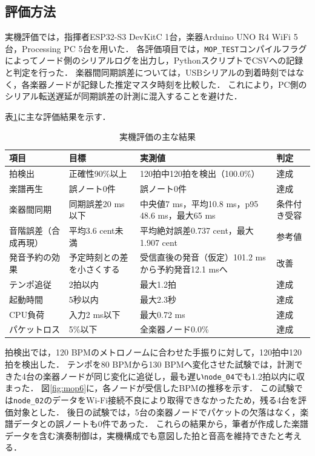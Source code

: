 \documentclass[uplatex,dvipdfmx]{jlreq}
\begin{document}
\subsection{評価方法}
実機評価では，指揮者ESP32-S3 DevKitC 1台，楽器Arduino UNO R4 WiFi 5台，Processing PC 5台を用いた．
各評価項目では，\texttt{MOP\_TEST}コンパイルフラグによってノード側のシリアルログを出力し，PythonスクリプトでCSVへの記録と判定を行った．
楽器間同期誤差については，USBシリアルの到着時刻ではなく，各楽器ノードが記録した推定マスタ時刻を比較した．
これにより，PC側のシリアル転送遅延が同期誤差の計測に混入することを避けた\cite{mop-report}．

表\ref{tab:evaluation}に主な評価結果を示す．

\begin{table}[H]
\centering
\caption{実機評価の主な結果}
\label{tab:evaluation}
\small
\begin{tabular}{p{23mm}p{35mm}p{43mm}p{25mm}}
\hline
項目 & 目標 & 実測値 & 判定 \\
\hline
拍検出 & 正確性90\%以上 & 120拍中120拍を検出（100.0\%） & 達成 \\
楽譜再生 & 誤ノート0件 & 誤ノート0件 & 達成 \\
楽器間同期 & 同期誤差20 ms以下 & 中央値7 ms，平均10.8 ms，p95 48.6 ms，最大65 ms & 条件付き受容 \\
音階誤差（合成再現） & 平均3.6 cent未満 & 平均絶対誤差0.737 cent，最大1.907 cent & 参考値 \\
発音予約の効果 & 予定時刻との差を小さくする & 受信直後の発音（仮定）101.2 msから予約発音12.1 msへ & 改善 \\
テンポ追従 & 2拍以内 & 最大1.2拍 & 達成 \\
起動時間 & 5秒以内 & 最大2.3秒 & 達成 \\
CPU負荷 & 入力2 ms以下 & 最大0.72 ms & 達成 \\
パケットロス & 5\%以下 & 全楽器ノード0.0\% & 達成 \\
\hline
\end{tabular}
\end{table}

拍検出では，120 BPMのメトロノームに合わせた手振りに対して，120拍中120拍を検出した．
テンポを80 BPMから130 BPMへ変化させた試験では，計測できた4台の楽器ノードが同じ変化に追従し，最も遅い\texttt{node\_04}でも1.2拍以内に収まった\cite{mop-report}．
図\ref{fig:mop6}に，各ノードが受信したBPMの推移を示す．
この試験では\texttt{node\_02}のデータをWi-Fi接続不良により取得できなかったため，残る4台を評価対象とした．
後日の試験では，5台の楽器ノードでパケットの欠落はなく，楽譜データとの誤ノートも0件であった．
これらの結果から，筆者が作成した楽譜データを含む演奏制御は，実機構成でも意図した拍と音高を維持できたと考える．
\end{document}
